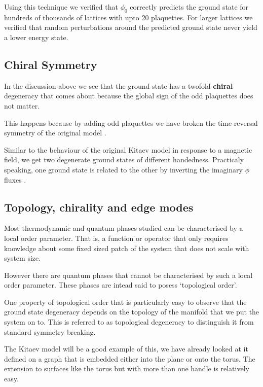 Using this technique we verified that \(\phi_0\) correctly predicts the
ground state for hundreds of thousands of lattices with upto 20
plaquettes. For larger lattices we verified that random perturbations
around the predicted ground state never yield a lower energy state.

\hypertarget{chiral-symmetry}{%
\subsection{Chiral Symmetry}\label{chiral-symmetry}}

In the discussion above we see that the ground state has a twofold
\textbf{chiral} degeneracy that comes about because the global sign of
the odd plaquettes does not matter.

This happens because by adding odd plaquettes we have broken the time
reversal symmetry of the original model
\autocite{Chua2011,yaoExactChiralSpin2007,ChuaPRB2011,Fiete2012,Natori2016,Wu2009,Peri2020,WangHaoranPRB2021}.

Similar to the behaviour of the original Kitaev model in response to a
magnetic field, we get two degenerate ground states of different
handedness. Practicaly speaking, one ground state is related to the
other by inverting the imaginary \(\phi\) fluxes
\autocite{yaoExactChiralSpin2007}.

\hypertarget{topology-chirality-and-edge-modes}{%
\subsection{Topology, chirality and edge
modes}\label{topology-chirality-and-edge-modes}}

Most thermodynamic and quantum phases studied can be characterised by a
local order parameter. That is, a function or operator that only
requires knowledge about some fixed sized patch of the system that does
not scale with system size.

However there are quantum phases that cannot be characterised by such a
local order parameter. These phases are intead said to posess
`topological order'.

One property of topological order that is particularly easy to observe
that the ground state degeneracy depends on the topology of the manifold
that we put the system on to. This is referred to as topological
degeneracy to distinguish it from standard symmetry breaking.

The Kitaev model will be a good example of this, we have already looked
at it defined on a graph that is embedded either into the plane or onto
the torus. The extension to surfaces like the torus but with more than
one handle is relatively easy.

